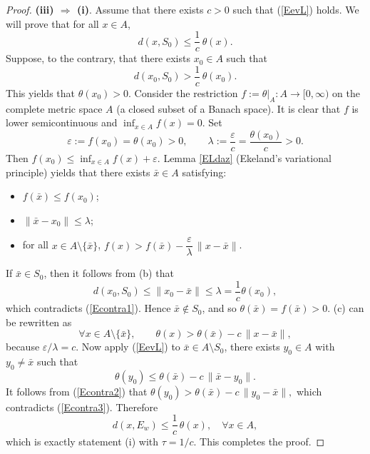 \documentclass[11pt]{article}
\begin{document}
\begin{proof}
	\noindent\textbf{(iii) $\Rightarrow$ (i)}.
	Assume that  there exists   \(c>0\) such that     (\ref{EevL})   holds.
	We will prove that for all \(x\in A\),
	\[
	d(x,S_0)\le \frac{1}{c}\,\theta(x).
	\]
	Suppose, to the contrary, that there exists \(x_0\in A\) such that  
	\begin{equation}\label{Econtra1}
		d(x_0,S_0)>\frac{1}{c}\,\theta(x_0).
	\end{equation}
	This yields  that	 \(\theta(x_0)>0\). 
	Consider the restriction \(f:=\theta|_A\colon A\to[0,\infty)\) on the complete metric space \(A\) (a closed subset of a Banach space). It is clear that \(f\) is lower semicontinuous  and \(\inf_{x \in A} f(x)=0\).  
	Set
	\[
	\varepsilon:=f(x_0)=\theta(x_0)>0,\qquad \lambda:=\frac{\varepsilon}{c}=\frac{\theta(x_0)}{c}>0 .
	\]
	Then \(f(x_0)\le \inf_{x \in A} f(x) +\varepsilon\).    Lemma  \ref{ELdaz} (Ekeland's variational principle)   yields that  there exists \(\bar x\in A\) satisfying:
	\begin{itemize}
		\item[(a)] \(f(\bar x)\le f(x_0)\);
		\item[(b)] \(\|\bar x-x_0\|\le \lambda\);
		\item[(c)] for all \(x\in A\setminus\{\bar x\}\), \(f(x) > f(\bar x)-\dfrac{\varepsilon}{\lambda}\,\|x-\bar x\|\).
	\end{itemize}
	If \(\bar x \in  S_0\), then  it follows from  (b) that
	\[
	d(x_0,S_0)\le \|x_0-\bar x\|\le \lambda = \frac{1}{c}\theta(x_0),
	\]
	which contradicts (\ref{Econtra1}). Hence   \(\bar x \notin  S_0\),  and so   \(\theta(\bar x)=f(\bar x)>0\).   (c) can be rewritten as
	\begin{equation}\label{Econtra2}
		\forall x\in A\setminus\{\bar x\},\qquad \theta(x) > \theta(\bar x) - c\,\|x-\bar x\|,
	\end{equation}
	because \(\varepsilon/\lambda = c\).
	Now apply  (\ref{EevL})   to \(\bar x\in A\setminus S_0\),  there exists \(y_0 \in A\) with \(y_0 \neq \bar x\) such that
	\begin{equation}\label{Econtra3}
		\theta(y_0 ) \le \theta(\bar x) - c\,\|\bar x-y_0\|.
	\end{equation}
	It follows from  (\ref{Econtra2})  that		$\theta(y_0) > \theta(\bar x) - c\,\|y_0-\bar x\|,$
	which contradicts (\ref{Econtra3}). 
	Therefore
	\[
	d(x,E_w)\le \frac{1}{c}\,\theta(x), \quad \forall x\in A,
	\]
	which is exactly statement (i) with \(\tau = 1/c\).  	This completes the proof. 
	\end{proof}  
\end{document}
